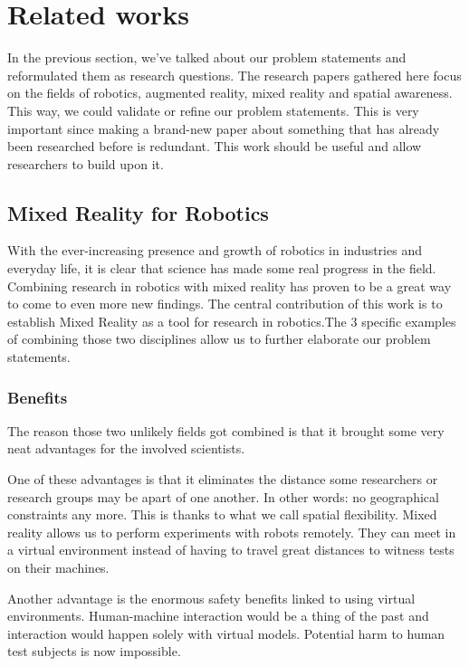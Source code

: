 \documentclass{article}
\begin{document}
\section{Related works}
In the previous section, we've talked about our problem statements and reformulated them as research questions. The research papers gathered here focus on the fields of robotics, augmented reality, mixed reality and spatial awareness. 
This way, we could validate or refine our problem statements. This is very important since making a brand-new paper about something that has already been researched before is redundant. This work should be useful and allow researchers to build upon it.

\subsection[Mixed Reality for Robotics]{Mixed Reality for Robotics\cite{hoenig2015mixed}}
With the ever-increasing presence and growth of robotics in industries and everyday life, it is clear that science has made some real progress in the field. Combining research in robotics with mixed reality has proven to be a great way to come to even more new findings. The central contribution of this work is to establish Mixed Reality as a tool for research in robotics.The 3 specific examples of combining those two disciplines allow us to further elaborate our problem statements.

\subsubsection{Benefits}
The reason those two unlikely fields got combined is that it brought some very neat advantages for the involved scientists. 

One of these advantages is that it eliminates the distance some researchers or research groups may be apart of one another. In other words: no geographical constraints any more. This is thanks to what we call spatial flexibility. Mixed reality allows us to perform experiments with robots remotely. They can meet in a virtual environment instead of having to travel great distances to witness tests on their machines.

Another advantage is the enormous safety benefits linked to using virtual environments. Human-machine interaction would be a thing of the past and interaction would happen solely with virtual models. Potential harm to human test subjects is now impossible.
\end{document}
